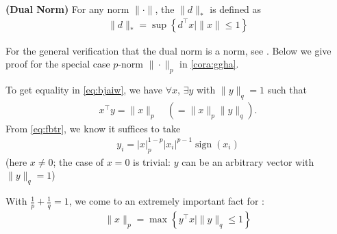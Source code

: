 \documentclass{article}
\newcommand{\bfs}[1]{\textbf{({#1}) }}
\begin{document}
\begin{defa}\bfs{Dual Norm}
For any norm $\|\cdot\|$, the  $\|d\|_{*}$ is defined as \begin{align*}
\|d\|_{*}=\sup \left\{d^{\top} x \mid\|x\| \leq 1\right\}
\end{align*}
\end{defa}
\begin{rema}
For the general verification that the dual norm is a norm, see \cite{horn2012matrix}. Below we give proof for the  special case $p$-norm $\|\cdot\|_p$ in \cref{cora:ggha}.
\end{rema}
\begin{cora}\label{cora:ggha}
 To get equality in \cref{eq:bjaiw}, we have  $\forall x$, $\exists y$ with $\|y\|_{q}=1$ such that
\begin{align*}
x^{\top} y=\|x\|_{p} \quad\left(=\|x\|_{p}\|y\|_{q}\right).
\end{align*}
From \cref{eq:fbtr}, we know it suffices to take
\begin{align*}
y_{i}=|x|_{p}^{1-p}\left|x_{i}\right|^{p-1} \operatorname{sign}\left(x_{i}\right)
\end{align*}
(here $x \neq 0$; the case of $x=0$ is trivial: $y$ can be an arbitrary vector with $\|y\|_{q}=1$)

With $\frac{1}{p}+\frac{1}{q}=1$, we come to an extremely important fact for :
\begin{align*}
\|x\|_{p}=\max \left\{y^{\top} x\mid  \|y\|_{q} \leq 1\right\} 
\end{align*}
\end{cora}
\end{document}
